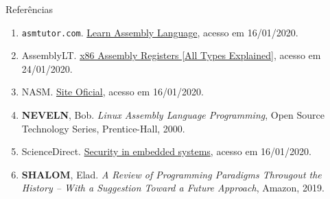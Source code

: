 \begin{frame}[fragile]{Referências}

    \begin{enumerate}
        \item \texttt{asmtutor.com}. \href{https://asmtutor.com/#lesson1}{Learn Assembly Language},
            acesso em 16/01/2020.
  
        \item AssemblyLT. \href{https://www.assemblylanguagetuts.com/x86-assembly-registers-explained/}{x86 Assembly Registers [All Types Explained]}, acesso em 24/01/2020.
 
        \item NASM. \href{https://www.nasm.us/}{Site Oficial}, acesso em 16/01/2020.
 
        \item \textbf{NEVELN}, Bob. \textit{Linux Assembly Language Programming}, Open Source
            Technology Series, Prentice-Hall, 2000.

        \item ScienceDirect. \href{https://www.sciencedirect.com/topics/computer-science/von-neumann-architecture}{Security in embedded systems}, acesso em 16/01/2020.
 
        \item \textbf{SHALOM}, Elad. \textit{A Review of Programming Paradigms Througout the 
            History -- With a Suggestion Toward a Future Approach}, Amazon, 2019.

    \end{enumerate}

\end{frame}
